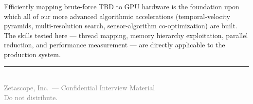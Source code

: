 \documentclass[11pt,letterpaper]{article}
\begin{document}
\noindent Efficiently mapping brute-force TBD to GPU hardware is the
foundation upon which all of our more advanced algorithmic accelerations
(temporal-velocity pyramids, multi-resolution search, sensor-algorithm
co-optimization) are built. The skills tested here --- thread mapping,
memory hierarchy exploitation, parallel reduction, and performance
measurement --- are directly applicable to the production system.

\vfill
\begin{center}
\rule{0.5\textwidth}{0.4pt}\\[0.5em]
{\small\textcolor{gray}{%
    Zetascope, Inc.\ --- Confidential Interview Material\\
    Do not distribute.
}}
\end{center}
\end{document}
